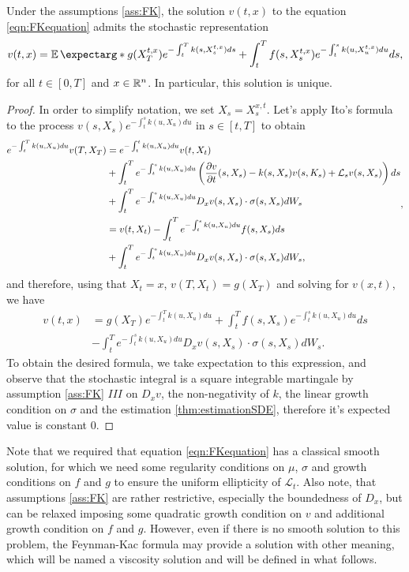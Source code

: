 \begin{theorem}
	Under the assumptions \ref{ass:FK}, the solution $v(t,x)$ to the equation \eqref{eqn:FKequation} admits the stochastic representation 
	\begin{equation}
		v(t,x)=\expect*{g(X_{T}^{t,x})e^{-\int_{t}^{T}k(s,X_{s}^{t,x})ds}+\int_{t}^{T}f(s,X_{s}^{t,x})e^{-\int_{t}^{s}k(u,X_{u}^{t,x})du}ds},
	\end{equation}
	 for all $t\in[0,T]$ and $x\in\mathbb{R}^n$. In particular, this solution is unique.
\end{theorem}
\begin{proof}
	In order to simplify notation, we set $X_s=X_{s}^{x,t}$. Let's apply Ito's formula to the process  $v(s,X_s)e^{-\int_{t}^{s}k(u,X_{u})du}$ in $s\in[t,T]$ to obtain
	\begin{equation}
		\begin{split}
		e^{-\int_{t}^{T}k(u,X_{u})du}v(T,X_T)&=e^{-\int_{t}^{t}k(u,X_{u})du}v(t,X_t)\\
		&+\int_{t}^{T}e^{-\int_{t}^{s}k(u,X_{u})du}\left(\frac{\partial v}{\partial t}(s,X_s)-k(s,X_s)v(s,K_s)+\mathcal{L}_s v(s,X_s)\right)ds\\
		&+\int_{t}^{T}e^{-\int_{t}^{s}k(u,X_{u})du}D_x v(s,X_s)\cdot \sigma(s,X_s)dW_s\\
		&=v(t,X_t)-\int_{t}^{T}e^{-\int_{t}^{s}k(u,X_{u})du}f(s,X_s)ds\\
		&+\int_{t}^{T}e^{-\int_{t}^{s}k(u,X_{u})du}D_x v(s,X_s)\cdot \sigma(s,X_s)dW_s,
		\end{split},
	\end{equation}
and therefore, using that $X_t=x$, $v(T,X_t)=g(X_T)$ and solving for $v(x,t)$, we have
\begin{equation}
	\begin{split}
		v(t,x)&=g(X_T)e^{-\int_{t}^{T}k(u,X_{u})du}+\int_{t}^{T}f(s,X_s)e^{-\int_{t}^{s}k(u,X_{u})du}ds\\
		&-\int_{t}^{T}e^{-\int_{t}^{s}k(u,X_{u})du}D_x v(s,X_s)\cdot \sigma(s,X_s)dW_s.
	\end{split}
\end{equation}
To obtain the desired formula, we take expectation to this expression, and observe that the stochastic integral is a square integrable martingale by assumption \ref{ass:FK} $III$ on $D_x v$, the non-negativity of $k$, the linear growth condition on $\sigma$ and the estimation \ref{thm:estimationSDE}, therefore it's expected value is constant $0$.
\end{proof}
Note that we required that equation \eqref{eqn:FKequation} has a classical smooth solution, for which we need some regularity conditions on $\mu$, $\sigma$ and growth conditions on $f$ and $g$ to ensure the uniform ellipticity of $\mathcal{L}_t$. Also note, that assumptions \ref{ass:FK} are rather restrictive, especially the boundedness of $D_x$, but can be relaxed imposing some quadratic growth condition on $v$ and additional growth condition on $f$ and $g$. However, even if there is no smooth solution to this problem, the Feynman-Kac formula may provide a solution with other meaning, which will be named a viscosity solution and will be defined in what follows.

